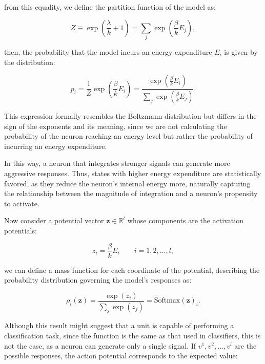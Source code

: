 \documentclass[12pt]{article}
\begin{document}
from this equality, we define the partition function of the model as:

\begin{equation}
Z \equiv \exp\left(\frac{\lambda}{k} + 1\right) = \sum_j \exp\left(\frac{\beta}{k} E_j\right),
\end{equation}

then, the probability that the model incurs an energy expenditure $E_i$ is given by the distribution:

\begin{equation}
p_i = \frac{1}{Z} \exp\left(\frac{\beta}{k} E_i\right) = \frac{\exp(\frac{\beta}{k} E_i)}{\sum_j \exp(\frac{\beta}{k} E_j)}  .
\end{equation}

This expression formally resembles the Boltzmann distribution but differs in the sign of the exponents and its meaning, since we are not calculating the probability of the neuron reaching an energy level but rather the probability of incurring an energy expenditure.

In this way, a neuron that integrates stronger signals can generate more aggressive responses. Thus, states with higher energy expenditure are statistically favored, as they reduce the neuron’s internal energy more, naturally capturing the relationship between the magnitude of integration and a neuron’s propensity to activate.

Now consider a potential vector $\mathbf{z} \in \mathbb{R}^l$ whose components are the activation potentials:

\begin{equation}
z_i = \frac{\beta}{k} E_i \qquad i = 1, 2, \dots, l  ,
\end{equation}

we can define a mass function for each coordinate of the potential, describing the probability distribution governing the model’s responses as:

\begin{equation}
\rho_i(\mathbf{z}) = \frac{\exp(z_i)}{\sum_j \exp(z_j)} = \text{Softmax}(\mathbf{z})_i.
\end{equation}

Although this result might suggest that a unit is capable of performing a classification task, since the function is the same as that used in classifiers, this is not the case, as a neuron can generate only a single signal. If $v^1, v^2, \dots, v^l$ are the possible responses, the action potential corresponds to the expected value:
\end{document}
